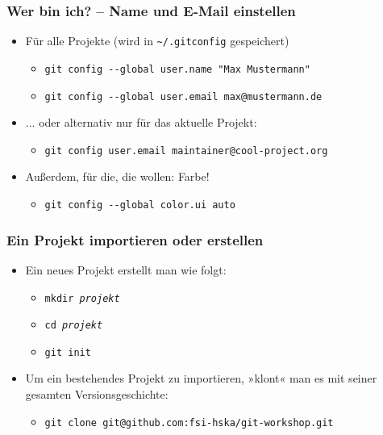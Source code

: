 \documentclass{beamer}
\begin{document}
\begin{frame}
 \frametitle{Wer bin ich? -- Name und E-Mail einstellen}



\begin{itemize}
	\item Für alle Projekte (wird in \texttt{\~{}/.gitconfig} gespeichert)
\begin{itemize}
	\item \texttt{git config -{}-global user.name "Max Mustermann"}
	\item \texttt{git config -{}-global user.email max@mustermann.de}
\end{itemize}
\end{itemize}

\begin{itemize}
	\item ... oder alternativ nur für das aktuelle Projekt:
\begin{itemize}
	\item \texttt{git config user.email maintainer@cool-project.org}
\end{itemize}
\end{itemize}

\begin{itemize}
	\item Außerdem, für die, die wollen: Farbe!
\begin{itemize}
	\item \texttt{git config -{}-global color.ui auto}
\end{itemize}
\end{itemize}


 \end{frame}
\begin{frame}
 \frametitle{Ein Projekt importieren oder erstellen}

\begin{itemize}
	\item Ein neues Projekt erstellt man wie folgt:
\begin{itemize}
	\item \texttt{mkdir \emph{projekt}}
	\item \texttt{cd \emph{projekt}}
	\item \texttt{git init}
\end{itemize}
\end{itemize}

\begin{itemize}
	\item Um ein bestehendes Projekt zu importieren, »klont« man es mit seiner gesamten Versionsgeschichte:
\begin{itemize}
	\item \texttt{git clone git@github.com:fsi-hska/git-workshop.git}
\end{itemize}
\end{itemize}


 \end{frame}
\end{document}
